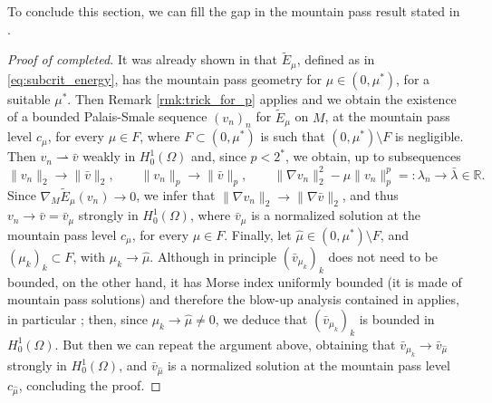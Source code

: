 \documentclass[10pt]{article}
\newcommand{\R}{\mathbb{R}}
\theoremstyle{definition}
\numberwithin{equation}{section}
\begin{document}
To conclude this section, we can fill the gap in the mountain pass result stated in \cite{MR3689156}.
%
\begin{proof}[Proof of {\cite[Proposition 4.4]{MR3689156}} completed]
It was already shown in \cite{MR3689156} that $\tilde E_\mu$, defined as in \eqref{eq:subcrit_energy}, 
has the mountain pass geometry for $\mu\in(0,\mu^*)$, for a suitable $\mu^*$. Then Remark 
\ref{rmk:trick_for_p} applies and we obtain the existence of a bounded Palais-Smale sequence $(v_n)_n$ 
for $\tilde E_\mu$ on $M$, at the mountain pass level $c_\mu$, for every $\mu\in F$, where $F\subset (0,\mu^*)$ is such that $(0,\mu^*)\setminus F$ is negligible. Then $v_n \rightharpoonup \bar v$ weakly in $H^1_0(\Omega)$ and, since $p<2^*$, we obtain, up to subsequences
\[
\|v_n\|_2 \to \|\bar v\|_2,\qquad
\|v_n\|_p \to \|\bar v\|_p,\qquad
\|\nabla v_n\|_2^2 - \mu\|v_n\|_p^p =:\lambda_n \to \bar \lambda \in\R.
\]
Since $\nabla_M\tilde E_\mu(v_n) \to 0$, we infer that $\|\nabla v_n\|_2 \to \|\nabla \bar v\|_2$, 
and thus $v_n \to \bar v = \bar v_\mu$ strongly in $H^1_0(\Omega)$, where  $\bar v_\mu$ is a 
normalized solution at the mountain pass level $c_\mu$, for every $\mu\in F$. Finally, let 
$\hat\mu\in (0,\mu^*)\setminus F$, and $(\mu_k)_k\subset F$, with $\mu_k\to\hat\mu$. Although 
in principle $(\bar v_{\mu_k})_k$ does not need to be bounded, on the other hand, it has Morse index 
uniformly bounded (it is made of mountain pass solutions) and therefore the blow-up analysis contained 
in \cite[Section 2]{MR3689156} applies, in particular \cite[Corollary 2.15]{MR3689156}; then, since 
$\mu_k\to\hat\mu\neq 0$, we deduce that $(\bar v_{\mu_k})_k$ is bounded in $H^1_0(\Omega)$. But then we 
can repeat the argument above, obtaining that $\bar v_{\mu_k} \to \bar v_{\hat\mu}$ strongly in 
$H^1_0(\Omega)$, and  $\bar v_{\hat\mu}$ is a 
normalized solution at the mountain pass level $c_{\hat\mu}$, concluding the proof.
\end{proof}
\end{document}
